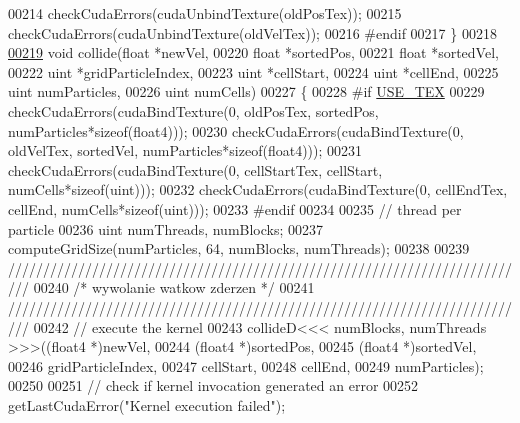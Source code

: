 \begin{DoxyCode}
00214         checkCudaErrors(cudaUnbindTexture(oldPosTex));
00215         checkCudaErrors(cudaUnbindTexture(oldVelTex));
00216 \textcolor{preprocessor}{#}\textcolor{preprocessor}{endif}
00217     \}
00218 
\hypertarget{particle_system__cuda_8cu_source_l00219}{}\hyperlink{particle_system__cuda_8cu_a917d67e2ed45ea11da51ac5d7004ddfd}{00219}     \textcolor{keywordtype}{void} collide(\textcolor{keywordtype}{float} *newVel,
00220                  \textcolor{keywordtype}{float} *sortedPos,
00221                  \textcolor{keywordtype}{float} *sortedVel,
00222                  uint  *gridParticleIndex,
00223                  uint  *cellStart,
00224                  uint  *cellEnd,
00225                  uint   numParticles,
00226                  uint   numCells)
00227     \{
00228 \textcolor{preprocessor}{#}\textcolor{preprocessor}{if} \hyperlink{particles__kernel_8cuh_a0ab211ca35e2616c721fcf2dd4f99c83}{USE\_TEX}
00229         checkCudaErrors(cudaBindTexture(0, oldPosTex, sortedPos, numParticles*\textcolor{keyword}{sizeof}(float4)));
00230         checkCudaErrors(cudaBindTexture(0, oldVelTex, sortedVel, numParticles*\textcolor{keyword}{sizeof}(float4)));
00231         checkCudaErrors(cudaBindTexture(0, cellStartTex, cellStart, numCells*\textcolor{keyword}{sizeof}(uint)));
00232         checkCudaErrors(cudaBindTexture(0, cellEndTex, cellEnd, numCells*\textcolor{keyword}{sizeof}(uint)));
00233 \textcolor{preprocessor}{#}\textcolor{preprocessor}{endif}
00234 
00235         \textcolor{comment}{// thread per particle}
00236         uint numThreads, numBlocks;
00237         computeGridSize(numParticles, 64, numBlocks, numThreads);
00238 
00239 \textcolor{comment}{///////////////////////////////////////////////////////////////////////////}
00240 \textcolor{comment}{/*      wywolanie watkow zderzen        */}
00241 \textcolor{comment}{///////////////////////////////////////////////////////////////////////////}
00242         \textcolor{comment}{// execute the kernel}
00243         collideD<<< numBlocks, numThreads >>>((float4 *)newVel,
00244                                               (float4 *)sortedPos,
00245                                               (float4 *)sortedVel,
00246                                               gridParticleIndex,
00247                                               cellStart,
00248                                               cellEnd,
00249                                               numParticles);
00250 
00251         \textcolor{comment}{// check if kernel invocation generated an error}
00252         getLastCudaError(\textcolor{stringliteral}{"Kernel execution failed"});

\end{DoxyCode}

